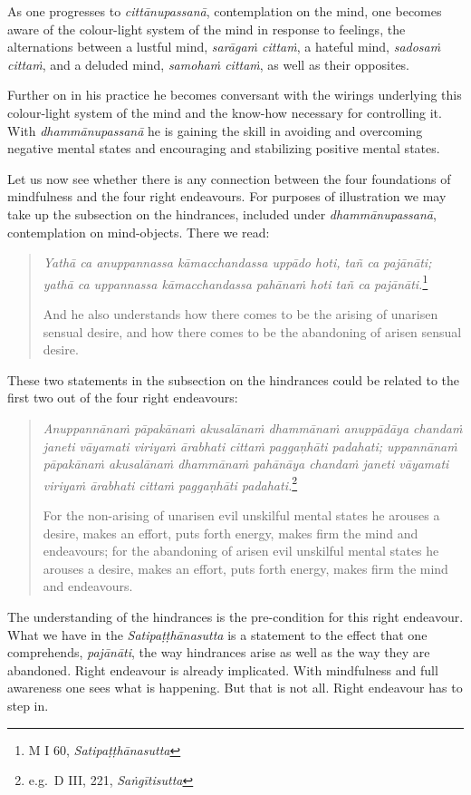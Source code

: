 As one progresses to \emph{cittānupassanā}, contemplation on the mind, one becomes aware of the colour-light system of the mind in response to feelings, the alternations between a lustful mind, \emph{sarāgaṁ cittaṁ}, a hateful mind, \emph{sadosaṁ cittaṁ}, and a deluded mind, \emph{samohaṁ cittaṁ}, as well as their opposites.

Further on in his practice he becomes conversant with the wirings underlying this colour-light system of the mind and the know-how necessary for controlling it. With \emph{dhammānupassanā} he is gaining the skill in avoiding and overcoming negative mental states and encouraging and stabilizing positive mental states.

Let us now see whether there is any connection between the four foundations of mindfulness and the four right endeavours. For purposes of illustration we may take up the subsection on the hindrances, included under \emph{dhammānupassanā}, contemplation on mind-objects. There we read:

\begin{quote}
\emph{Yathā ca anuppannassa kāmacchandassa uppādo hoti, tañ ca pajānāti; yathā ca uppannassa kāmacchandassa pahānaṁ hoti tañ ca pajānāti.}\footnote{M I 60, \emph{Satipaṭṭhānasutta}}

And he also understands how there comes to be the arising of unarisen sensual desire, and how there comes to be the abandoning of arisen sensual desire.
\end{quote}

These two statements in the subsection on the hindrances could be related to the first two out of the four right endeavours:

\begin{quote}
\emph{Anuppannānaṁ pāpakānaṁ akusalānaṁ dhammānaṁ anuppādāya chandaṁ janeti vāyamati viriyaṁ ārabhati cittaṁ paggaṇhāti padahati; uppannānaṁ pāpakānaṁ akusalānaṁ dhammānaṁ pahānāya chandaṁ janeti vāyamati viriyaṁ ārabhati cittaṁ paggaṇhāti padahati.}\footnote{e.g.~D III, 221, \emph{Saṅgītisutta}}

For the non-arising of unarisen evil unskilful mental states he arouses a desire, makes an effort, puts forth energy, makes firm the mind and endeavours; for the abandoning of arisen evil unskilful mental states he arouses a desire, makes an effort, puts forth energy, makes firm the mind and endeavours.
\end{quote}

The understanding of the hindrances is the pre-condition for this right endeavour. What we have in the \emph{Satipaṭṭhānasutta} is a statement to the effect that one comprehends, \emph{pajānāti}, the way hindrances arise as well as the way they are abandoned. Right endeavour is already implicated. With mindfulness and full awareness one sees what is happening. But that is not all. Right endeavour has to step in.

